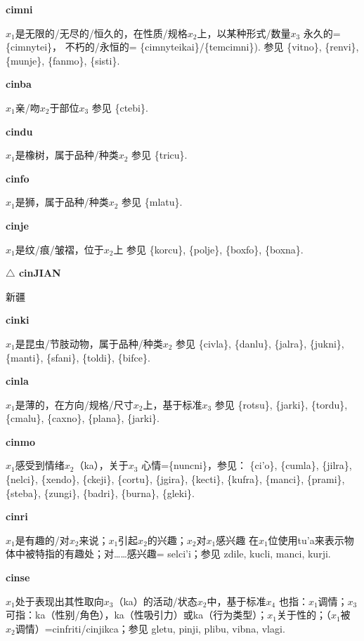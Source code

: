 \documentclass[notitlepage,twocolumn,a4paper,10pt]{book}
\begin{document}
{\sffamily\bfseries cimni} $x_1$是无限的\slash{}无尽的\slash{}恒久的，在性质\slash{}规格$x_2$上，以某种形式\slash{}数量$x_3$ \textemdash{} 永久的= \{cimnytei\}， 不朽的\slash{}永恒的= \{cimnyteikai\}\slash{}\{temcimni\}). 参见 \{vitno\}, \{renvi\}, \{munje\}, \{fanmo\}, \{sisti\}.

{\sffamily\bfseries cinba} $x_1$亲\slash{}吻$x_2$于部位$x_3$ \textemdash{} 参见 \{ctebi\}.

{\sffamily\bfseries cindu} $x_1$是橡树，属于品种\slash{}种类$x_2$ \textemdash{} 参见 \{tricu\}.

{\sffamily\bfseries cinfo} $x_1$是狮，属于品种\slash{}种类$x_2$ \textemdash{} 参见 \{mlatu\}.

{\sffamily\bfseries cinje}\enspace {\ttfamily\bfseries[cij]}  $x_1$是纹\slash{}痕\slash{}皱褶，位于$x_2$上 \textemdash{} 参见 \{korcu\}, \{polje\}, \{boxfo\}, \{boxna\}.

{\sffamily\bfseries $\triangle$ cinJIAN} 新疆

{\sffamily\bfseries cinki} $x_1$是昆虫\slash{}节肢动物，属于品种\slash{}种类$x_2$ \textemdash{} 参见 \{civla\}, \{danlu\}, \{jalra\}, \{jukni\}, \{manti\}, \{sfani\}, \{toldi\}, \{bifce\}.

{\sffamily\bfseries cinla} $x_1$是薄的，在方向\slash{}规格\slash{}尺寸$x_2$上，基于标准$x_3$ \textemdash{} 参见 \{rotsu\}, \{jarki\}, \{tordu\}, \{cmalu\}, \{caxno\}, \{plana\}, \{jarki\}.

{\sffamily\bfseries cinmo}\enspace {\ttfamily\bfseries[    cni]}  $x_1$感受到情绪$x_2$（ka），关于$x_3$ \textemdash{} 心情=\{nuncni\}，参见： \{ci'o\}, \{cumla\}, \{jilra\}, \{nelci\}, \{xendo\}, \{ckeji\}, \{cortu\}, \{jgira\}, \{kecti\}, \{kufra\}, \{manci\}, \{prami\}, \{steba\}, \{zungi\}, \{badri\}, \{burna\}, \{gleki\}.

{\sffamily\bfseries cinri}\enspace {\ttfamily\bfseries[        ci'i]}  $x_1$是有趣的\slash{}对$x_2$来说；$x_1$引起$x_2$的兴趣；$x_2$对$x_1$感兴趣 \textemdash{} 在$x_1$位使用tu'a来表示物体中被特指的有趣处；对……感兴趣= {selci'i}；参见 {zdile}, {kucli}, {manci}, {kurji}.

{\sffamily\bfseries cinse}\enspace {\ttfamily\bfseries[cin]}  $x_1$处于表现出其性取向$x_3$（ka）的活动\slash{}状态$x_2$中，基于标准$x_4$ \textemdash{} 也指：$x_1$调情；$x_3$可指：ka（性别\slash{}角色），ka（性吸引力）或ka（行为类型）；$x_1$关于性的；（$x_1$被$x_2$调情）={cinfriti}\slash{}{cinjikca}；参见 {gletu}, {pinji}, {plibu}, {vibna}, {vlagi}.
\end{document}

